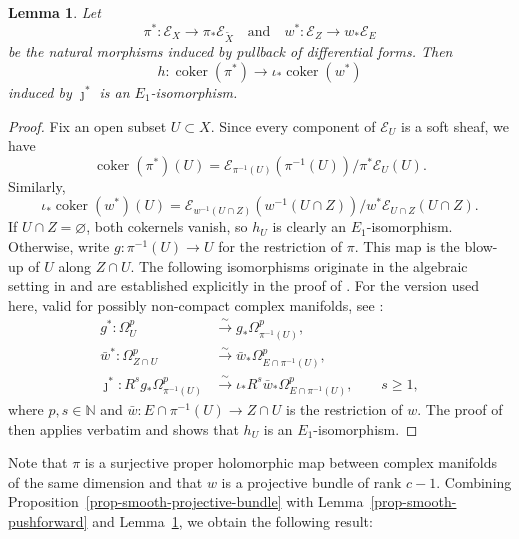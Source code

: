 \documentclass[11pt]{amsart}
\numberwithin{equation}{section}
\theoremstyle{plain}
\newtheorem{Le}[thm]{Lemma}
\theoremstyle{definition}
\begin{document}
\begin{Le}\label{prop-smooth-blowup-cokernel}
Let
\[
\pi^*: \mathcal E_X \longrightarrow \pi_*\mathcal E_{\tilde{X}}
\quad\text{and}\quad
w^*: \mathcal E_Z \longrightarrow w_*\mathcal E_{E}
\]
be the natural morphisms induced by pullback of differential forms.  Then
\[
h: \operatorname{coker}(\pi^*)
\longrightarrow \iota_*\operatorname{coker}(w^*)
\]
induced by $\jmath^*$ is an $E_1$-isomorphism.

\end{Le}

\begin{proof}
Fix an open subset $U\subset X$.  Since every component of $\mathcal E_U$
is a soft sheaf, we have
\[\operatorname{coker}(\pi^*)(U)=\mathcal E_{\pi^{-1}(U)}(\pi^{-1}(U))/\pi^* \mathcal E_{U}(U).\]
Similarly,  \[\iota_*\operatorname{coker}(w^*)(U)=\mathcal E_{w^{-1}(U\cap Z)}(w^{-1}(U\cap Z))/w^* \mathcal E_{U\cap Z}(U\cap Z). \]
If $U\cap Z=\varnothing$, both cokernels vanish, so $h_U$ is clearly an
$E_1$-isomorphism.  Otherwise, write
$g:\pi^{-1}(U)\longrightarrow U$ for the restriction of $\pi$.  This map is
the blow-up of $U$ along $Z\cap U$.  The following isomorphisms originate
in the algebraic setting in \cite[chapitre~IV, th\'eor\`eme~1.2.1]{G}
and are established explicitly in the proof of \cite[proposition~(3.3)]{GNA}.
For the version used here, valid for possibly non-compact complex
manifolds, see \cite[Lemma~4.1]{M}:
\begin{align*}
g^*: \Omega_U^p
&\xrightarrow{\sim} g_*\Omega_{\pi^{-1}(U)}^p,\\
\bar{w}^*: \Omega_{Z\cap U}^p
&\xrightarrow{\sim} \bar{w}_*\Omega_{E\cap \pi^{-1}(U)}^p,\\
\jmath^*: R^sg_*\Omega_{\pi^{-1}(U)}^p
&\xrightarrow{\sim} \iota_*R^s\bar{w}_*\Omega_{E\cap \pi^{-1}(U)}^p,
\qquad s\geq1,
\end{align*}
where $p,s\in\mathbb N$ and
$\bar{w}:E\cap\pi^{-1}(U)\longrightarrow Z\cap U$ is the restriction of
$w$.  The proof of \cite[Theorem 5.1]{Se21} then applies verbatim and shows
that $h_U$ is an $E_1$-isomorphism.
\end{proof}
Note that $\pi$ is a surjective proper holomorphic map between complex
manifolds of the same dimension and that $w$ is a projective bundle of rank
$c-1$.
Combining Proposition~\ref{prop-smooth-projective-bundle} with
Lemma~\ref{prop-smooth-pushforward} and
Lemma~\ref{prop-smooth-blowup-cokernel}, we
obtain the following result:
\end{document}
